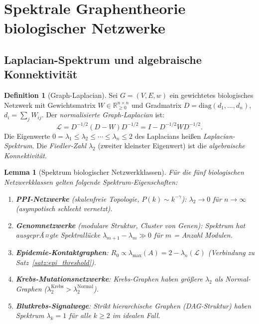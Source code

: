 ﻿\documentclass[a4paper,12pt]{article}
\theoremstyle{plain}
\newtheorem{lemma}{Lemma}
\theoremstyle{definition}
\newtheorem{definition}{Definition}
\theoremstyle{remark}
\begin{document}
\section{Spektrale Graphentheorie biologischer Netzwerke}

\subsection{Laplacian-Spektrum und algebraische Konnektivit\"at}

\begin{definition}[Graph-Laplacian]
\label{def:laplacian}
Sei $G = (V, E, w)$ ein gewichtetes biologisches Netzwerk mit
Gewichtsmatrix $W \in \mathbb{R}_{\geq 0}^{n\times n}$
und Gradmatrix $D = \mathrm{diag}(d_1, \ldots, d_n)$,
$d_i = \sum_j W_{ij}$.
Der \emph{normalisierte Graph-Laplacian} ist:
\[
\mathcal{L} = D^{-1/2}(D - W)D^{-1/2} = I - D^{-1/2}WD^{-1/2}.
\]
Die Eigenwerte $0 = \lambda_1 \leq \lambda_2 \leq \cdots \leq \lambda_n \leq 2$
des Laplacians hei{\ss}en \emph{Laplacian-Spektrum}.
Die \emph{Fiedler-Zahl} $\lambda_2$ (zweiter kleinster Eigenwert)
ist die \emph{algebraische Konnektivit\"at}.
\end{definition}

\begin{lemma}[Spektrum biologischer Netzwerkklassen]
\label{lem:spektrum_bio}
F\"ur die f\"unf biologischen Netzwerkklassen gelten folgende
Spektrum-Eigenschaften:
\begin{enumerate}[label=(\roman*)]
    \item \textbf{PPI-Netzwerke} (skalenfreie Topologie, $P(k) \sim k^{-\gamma}$):
          $\lambda_2 \to 0$ f\"ur $n \to \infty$ (asympotisch schlecht vernetzt).
    \item \textbf{Genomnetzwerke} (modulare Struktur, Cluster von Genen):
          Spektrum hat ausgeprÃ¤gte \emph{Spektrall\"ucke}
          $\lambda_{m+1} - \lambda_m \gg 0$ f\"ur $m$ = Anzahl Modulen.
    \item \textbf{Epidemie-Kontaktgraphen}:
          $R_0 \propto \lambda_{\max}(A) = 2 - \lambda_n(\mathcal{L})$
          (Verbindung zu Satz~\ref{satz:epi_threshold}).
    \item \textbf{Krebs-Mutationsnetzwerke}:
          Krebs-Graphen haben gr\"o{\ss}ere $\lambda_2$ als Normal-Graphen
          ($\lambda_2^{\mathrm{Krebs}} > \lambda_2^{\mathrm{Normal}}$).
    \item \textbf{Blutkrebs-Signalwege}:
          Strikt hierarchische Graphen (DAG-Struktur) haben
          Spektrum $\lambda_k = 1$ f\"ur alle $k \geq 2$ im idealen Fall.
\end{enumerate}
\end{lemma}
\end{document}
